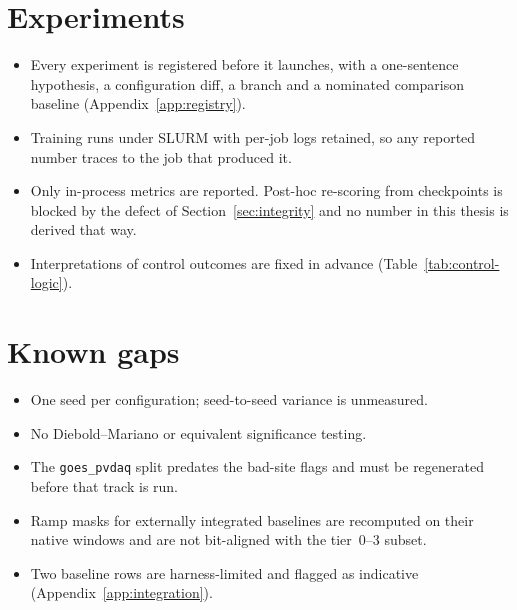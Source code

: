 \section{Experiments}

\begin{itemize}
  \item Every experiment is registered before it launches, with a one-sentence hypothesis,
    a configuration diff, a branch and a nominated comparison baseline
    (Appendix~\ref{app:registry}).
  \item Training runs under SLURM with per-job logs retained, so any reported number traces
    to the job that produced it.
  \item Only in-process metrics are reported. Post-hoc re-scoring from checkpoints is
    blocked by the defect of Section~\ref{sec:integrity} and no number in this thesis is
    derived that way.
  \item Interpretations of control outcomes are fixed in advance
    (Table~\ref{tab:control-logic}).
\end{itemize}

\section{Known gaps}

\begin{itemize}
  \item One seed per configuration; seed-to-seed variance is unmeasured.
  \item No Diebold--Mariano or equivalent significance testing.
  \item The \texttt{goes\_pvdaq} split predates the bad-site flags and must be regenerated
    before that track is run.
  \item Ramp masks for externally integrated baselines are recomputed on their native
    windows and are not bit-aligned with the tier~0--3 subset.
  \item Two baseline rows are harness-limited and flagged as indicative
    (Appendix~\ref{app:integration}).
\end{itemize}

\par

